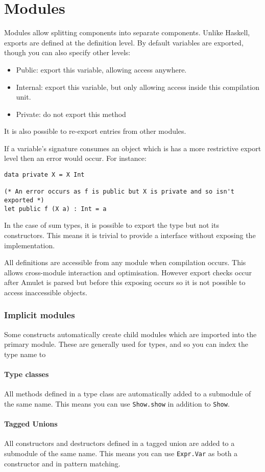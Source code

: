 \section{Modules}
Modules allow splitting components into separate components. Unlike Haskell, exports are defined at the definition level. By default variables are exported, though you can also specify other levels:

\begin{itemize}
\item Public: export this variable, allowing access anywhere.
\item Internal: export this variable, but only allowing access inside this compilation unit.
\item Private: do not export this method
\end{itemize}

It is also possible to re-export entries from other modules.

If a variable's signature consumes an object which is has a more restrictive export level then an error would occur. For instance:

\begin{verbatim}
data private X = X Int

(* An error occurs as f is public but X is private and so isn't exported *)
let public f (X a) : Int = a
\end{verbatim}

In the case of sum types, it is possible to export the type but not its constructors. This means it is trivial to provide a interface without exposing the implementation.

All definitions are accessible from any module when compilation occurs. This allows cross-module interaction and optimisation. However export checks occur after Amulet is parsed but before this exposing occurs so it is not possible to access inaccessible objects.

\subsubsection{Implicit modules}
Some constructs automatically create child modules which are imported into the primary module. These are generally used for types, and so you can index the type name to 

\paragraph{Type classes} All methods defined in a type class are automatically added to a submodule of the same name. This means you can use \texttt{Show.show} in addition to \texttt{Show}.

\paragraph{Tagged Unions} All constructors and destructors defined in a tagged union are added to a submodule of the same name. This means you can use \texttt{Expr.Var} as both a constructor and in pattern matching.